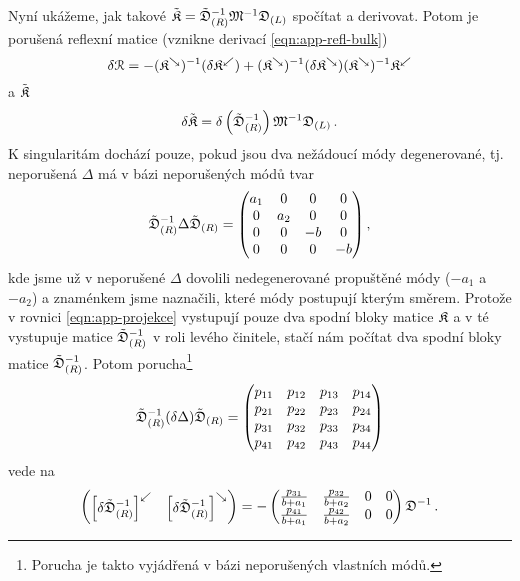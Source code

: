 Nyní ukážeme, jak takové $\tilde{\mathfrak{K}}=\tilde{\mathfrak{D}}_{(R)}^{-1}\mathfrak{M}^{-1}\mathfrak{D}_{(L)}$ spočítat a derivovat.
Potom je porušená reflexní matice (vznikne derivací \eqref{eqn:app-refl-bulk})
\begin{equation}
    \label{eqn:app-dR-bulk}
    \delta\mathcal{R} = -(\mathfrak{K}^\searrow)^{-1} (\delta\mathfrak{K}^\swarrow) + (\mathfrak{K}^\searrow)^{-1} (\delta\mathfrak{K}^\searrow)(\mathfrak{K}^\searrow)^{-1}\mathfrak{K}^\swarrow
\end{equation}
a $\tilde{\mathfrak{K}}$
\begin{equation}
    \delta\tilde{\mathfrak{K}} = \delta\left(\tilde{\mathfrak{D}}_{(R)}^{-1}\right)\mathfrak{M}^{-1}\mathfrak{D}_{(L)} \,.
\end{equation}
K singularitám dochází pouze, pokud jsou dva nežádoucí módy degenerované, tj. neporušená $\Delta$ má v bázi neporušených módů tvar
\begin{equation}
    \tilde{\mathfrak{D}}_{(R)}^{-1}\Delta\tilde{\mathfrak{D}}_{(R)} = \begin{pmatrix} 
        a_1&0&0&0\\0&a_2&0&0\\
        0&0&-b&0\\0&0&0&-b
    \end{pmatrix},
\end{equation}
kde jsme už v neporušené $\Delta$ dovolili nedegenerované propuštěné módy ($-a_1$ a $-a_2$) a znaménkem jsme naznačili, které módy postupují kterým směrem.
Protože v rovnici \eqref{eqn:app-projekce} vystupují pouze dva spodní bloky matice $\mathfrak{K}$ a v té vystupuje matice $\tilde{\mathfrak{D}}_{(R)}^{-1}$ v roli levého činitele, stačí nám počítat dva spodní bloky matice $\tilde{\mathfrak{D}}_{(R)}^{-1}$.
Potom porucha\footnote{Porucha je takto vyjádřená v bázi neporušených vlastních módů.}
\begin{equation}
    \tilde{\mathfrak{D}}_{(R)}^{-1}(\delta\Delta)\tilde{\mathfrak{D}}_{(R)} = \begin{pmatrix} 
    p_{11}&p_{12}&p_{13}&p_{14} \\
    p_{21}&p_{22}&p_{23}&p_{24} \\
    p_{31}&p_{32}&p_{33}&p_{34} \\
    p_{41}&p_{42}&p_{43}&p_{44} \\
\end{pmatrix}
\end{equation}
vede na
\begin{equation}
    \begin{pmatrix}\left[\delta\tilde{\mathfrak{D}}_{(R)}^{-1}\right]^\swarrow & \left[\delta\tilde{\mathfrak{D}}_{(R)}^{-1} \right]^\searrow \end{pmatrix} =  -\begin{pmatrix} 
    \frac{p_{31}}{b+a_1}&\frac{p_{32}}{b+a_2}&0&0 \\
    \frac{p_{41}}{b+a_1}&\frac{p_{42}}{b+a_2}&0&0 \\
\end{pmatrix} \mathfrak{D}^{-1} \,.
\end{equation}


